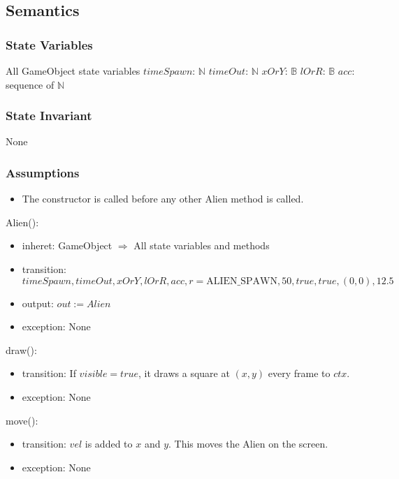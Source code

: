 \documentclass[12pt]{article}
\begin{document}
\subsection* {Semantics}

\subsubsection* {State Variables}

All GameObject state variables
$timeSpawn$: $\mathbb{N}$
$timeOut$: $\mathbb{N}$
$xOrY$: $\mathbb{B}$
$lOrR$: $\mathbb{B}$
$acc$: sequence of $\mathbb{N}$

\subsubsection* {State Invariant}

None

\subsubsection* {Assumptions}

\begin{itemize}
  \item The constructor is called before any other Alien method is called.
\end{itemize}

Alien():
\begin{itemize}
  \item inheret: GameObject $\Rightarrow$ All state variables and methods
  \item transition: $ timeSpawn, timeOut, xOrY, lOrR, acc, r = \mbox{ALIEN\_SPAWN}, 50, true, true, (0,0), 12.5 $\\
  \item output: $out := Alien$
  \item exception: None
\end{itemize}

draw():
\begin{itemize}
  \item transition: If $visible = true$, it draws a square at $(x,y)$ every frame to $ctx$.
  \item exception: None
\end{itemize}

move():
\begin{itemize}
  \item transition: $vel$ is added to $x$ and $y$. This moves the Alien on the screen.
  \item exception: None
\end{itemize}
\end{document}
